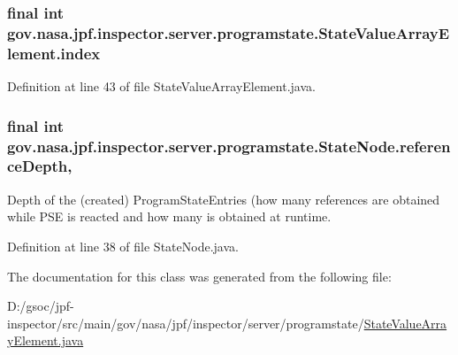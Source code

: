 \subsubsection[{\texorpdfstring{index}{index}}]{\setlength{\rightskip}{0pt plus 5cm}final int gov.\+nasa.\+jpf.\+inspector.\+server.\+programstate.\+State\+Value\+Array\+Element.\+index\hspace{0.3cm}{\ttfamily [protected]}}\hypertarget{classgov_1_1nasa_1_1jpf_1_1inspector_1_1server_1_1programstate_1_1_state_value_array_element_aa6411af2bddb25d2f9e779b08063e9e5}{}\label{classgov_1_1nasa_1_1jpf_1_1inspector_1_1server_1_1programstate_1_1_state_value_array_element_aa6411af2bddb25d2f9e779b08063e9e5}


Definition at line 43 of file State\+Value\+Array\+Element.\+java.

\subsubsection[{\texorpdfstring{reference\+Depth}{referenceDepth}}]{\setlength{\rightskip}{0pt plus 5cm}final int gov.\+nasa.\+jpf.\+inspector.\+server.\+programstate.\+State\+Node.\+reference\+Depth\hspace{0.3cm}{\ttfamily [protected]}, {\ttfamily [inherited]}}\hypertarget{classgov_1_1nasa_1_1jpf_1_1inspector_1_1server_1_1programstate_1_1_state_node_a55683618625dae46e8aa68d95811d6bb}{}\label{classgov_1_1nasa_1_1jpf_1_1inspector_1_1server_1_1programstate_1_1_state_node_a55683618625dae46e8aa68d95811d6bb}


Depth of the (created) Program\+State\+Entries (how many references are obtained while P\+SE is reacted and how many is obtained at runtime. 



Definition at line 38 of file State\+Node.\+java.



The documentation for this class was generated from the following file\+:\begin{DoxyCompactItemize}
\item 
D\+:/gsoc/jpf-\/inspector/src/main/gov/nasa/jpf/inspector/server/programstate/\hyperlink{_state_value_array_element_8java}{State\+Value\+Array\+Element.\+java}\end{DoxyCompactItemize}
